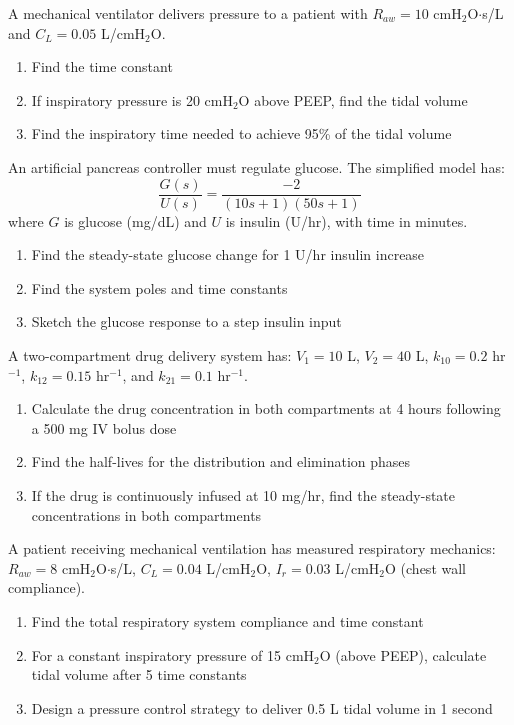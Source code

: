 \begin{exercise}
A mechanical ventilator delivers pressure to a patient with $R_{aw} = 10$ cmH$_2$O$\cdot$s/L and $C_L = 0.05$ L/cmH$_2$O.
\begin{enumerate}[label=(\alph*)]
    \item Find the time constant
    \item If inspiratory pressure is 20 cmH$_2$O above PEEP, find the tidal volume
    \item Find the inspiratory time needed to achieve 95\% of the tidal volume
\end{enumerate}
\end{exercise}

\begin{exercise}
An artificial pancreas controller must regulate glucose. The simplified model has:
\begin{equation}
\frac{G(s)}{U(s)} = \frac{-2}{(10s+1)(50s+1)}
\end{equation}
where $G$ is glucose (mg/dL) and $U$ is insulin (U/hr), with time in minutes.
\begin{enumerate}[label=(\alph*)]
    \item Find the steady-state glucose change for 1 U/hr insulin increase
    \item Find the system poles and time constants
    \item Sketch the glucose response to a step insulin input
\end{enumerate}
\end{exercise}

\begin{exercise}
A two-compartment drug delivery system has: $V_1 = 10$ L, $V_2 = 40$ L, $k_{10} = 0.2$ hr$^{-1}$, $k_{12} = 0.15$ hr$^{-1}$, and $k_{21} = 0.1$ hr$^{-1}$.
\begin{enumerate}[label=(\alph*)]
    \item Calculate the drug concentration in both compartments at 4 hours following a 500 mg IV bolus dose
    \item Find the half-lives for the distribution and elimination phases
    \item If the drug is continuously infused at 10 mg/hr, find the steady-state concentrations in both compartments
\end{enumerate}
\end{exercise}

\begin{exercise}
A patient receiving mechanical ventilation has measured respiratory mechanics: $R_{aw} = 8$ cmH$_2$O$\cdot$s/L, $C_L = 0.04$ L/cmH$_2$O, $I_r = 0.03$ L/cmH$_2$O (chest wall compliance).
\begin{enumerate}[label=(\alph*)]
    \item Find the total respiratory system compliance and time constant
    \item For a constant inspiratory pressure of 15 cmH$_2$O (above PEEP), calculate tidal volume after 5 time constants
    \item Design a pressure control strategy to deliver 0.5 L tidal volume in 1 second
\end{enumerate}
\end{exercise}

